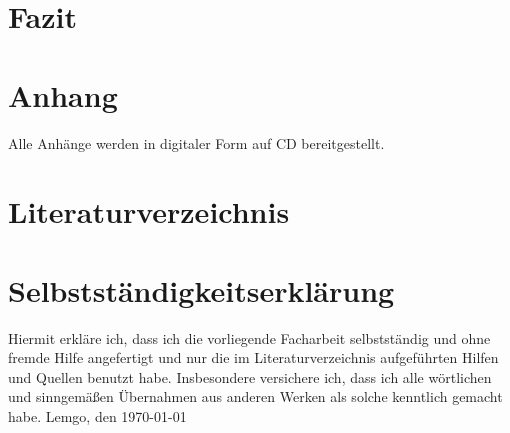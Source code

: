 \documentclass[a4paper,12pt,titlepage,ngerman]{article}
\begin{document}
\begin{sloppypar}
  \section{Fazit}\label{sec:Conclusion}
  \section{Anhang}\label{sec:anhang}
  Alle Anhänge werden in digitaler Form auf CD bereitgestellt.
  \section{Literaturverzeichnis}\label{sec:Literature}
  \printbibliography[heading=none]
  \section{Selbstständigkeitserklärung}\label{sec:IDidThisMyself}
  Hiermit erkläre ich, dass ich die vorliegende Facharbeit selbstständig und ohne fremde Hilfe angefertigt und nur die im Literaturverzeichnis
  aufgeführten Hilfen und Quellen benutzt habe.
  Insbesondere versichere ich, dass ich alle wörtlichen
  und sinngemä\ss en Übernahmen aus anderen Werken als solche kenntlich gemacht habe.
  \medskip
  Lemgo, den \today
  \medskip
 \end{sloppypar}
\end{document}
